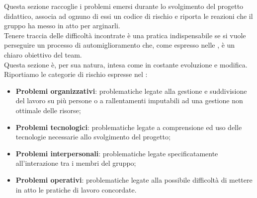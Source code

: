Questa sezione raccoglie i problemi emersi durante lo svolgimento del progetto didattico, associa 
ad ognuno di essi un codice di rischio e riporta le reazioni che il gruppo ha messo in atto 
per arginarli. \\
Tenere traccia delle difficoltà incontrate è una pratica indispensabile se si 
vuole perseguire un processo di automiglioramento che, come espresso nelle \NdP, è un 
chiaro obiettivo del team. \\
Questa sezione è, per sua natura, intesa come in costante evoluzione e modifica.\\
Riportiamo le categorie di rischio espresse nel \PdP: 


\begin{itemize}
	\item \textbf{Problemi organizzativi}: problematiche legate alla gestione e suddivisione del lavoro su più persone o a rallentamenti imputabili ad una gestione non ottimale delle risorse;
   \item \textbf{Problemi tecnologici}: problematiche legate a comprensione ed uso delle tecnologie necessarie allo svolgimento del progetto;
   \item \textbf{Problemi interpersonali}: problematiche legate specificatamente all'interazione tra i membri del gruppo;
   \item \textbf{Problemi operativi}: problematiche legate alla possibile difficoltà di mettere in atto le pratiche di lavoro concordate.
 
\end{itemize}

